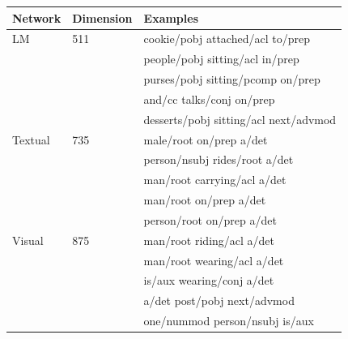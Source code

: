 \begin{table}
  \centering
\begin{tabular}{lll}
  Network            & Dimension & Examples         \\\hline
  {\sc LM}           & 511       & cookie/pobj attached/acl to/prep \\
                     &           & people/pobj sitting/acl in/prep \\
                     &           & purses/pobj sitting/pcomp on/prep\\
                     &           & and/cc talks/conj on/prep \\
                     &           & desserts/pobj sitting/acl next/advmod \\\hline
  {\sc Textual}      & 735       & male/root on/prep a/det        \\
                     &           & person/nsubj rides/root a/det   \\
                     &           & man/root carrying/acl a/det \\
                     &           & man/root on/prep a/det         \\
                     &           & person/root on/prep a/det       \\\hline
  {\sc Visual}       &  875      & man/root riding/acl a/det \\
                     &           & man/root wearing/acl a/det \\
                     &           & is/aux wearing/conj a/det \\
                     &           & a/det post/pobj next/advmod \\
                     &           & one/nummod person/nsubj is/aux \\


\end{tabular}
\end{table}
